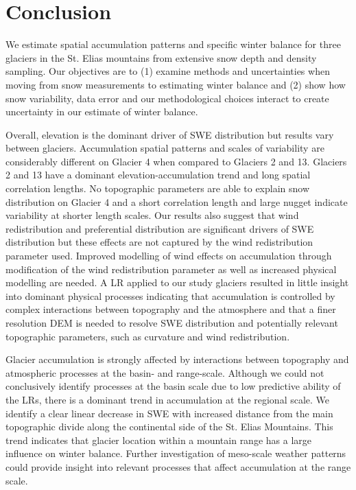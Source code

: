 \documentclass[twocolumn, letterpaper]{igs}
\begin{document}
\section{Conclusion}

We estimate spatial accumulation patterns and specific winter balance for three glaciers in the St. Elias mountains from extensive snow depth and density sampling. Our objectives are to (1) examine methods and uncertainties when moving from snow measurements to estimating winter balance and (2) show how snow variability, data error and our methodological choices interact to create uncertainty in our estimate of winter balance.

Overall, elevation is the dominant driver of SWE distribution but results vary between glaciers. Accumulation spatial patterns and scales of variability are considerably different on Glacier 4 when compared to Glaciers 2 and 13. Glaciers 2 and 13 have a dominant elevation-accumulation trend and long spatial correlation lengths. No topographic parameters are able to explain snow distribution on Glacier 4 and a short correlation length and large nugget indicate variability at shorter length scales. Our results also suggest that wind redistribution and preferential distribution are significant drivers of SWE distribution but these effects are not captured by the wind redistribution parameter used. Improved modelling of wind effects on accumulation through modification of the wind redistribution parameter as well as increased physical modelling are needed. A LR applied to our study glaciers resulted in little insight into dominant physical processes indicating that accumulation is controlled by complex interactions between topography and the atmosphere and that a finer resolution DEM is needed to resolve SWE distribution and potentially relevant topographic parameters, such as curvature and wind redistribution.

Glacier accumulation is strongly affected by interactions between topography and atmospheric processes at the basin- and range-scale. Although we could not conclusively identify processes at the basin scale due to low predictive ability of the LRs, there is a dominant trend in accumulation at the regional scale. We identify a clear linear decrease in SWE with increased distance from the main topographic divide along the continental side of the St. Elias Mountains. This trend indicates that glacier location within a mountain range has a large influence on winter balance. Further investigation of meso-scale weather patterns could provide insight into relevant processes that affect accumulation at the range scale.
\end{document}
